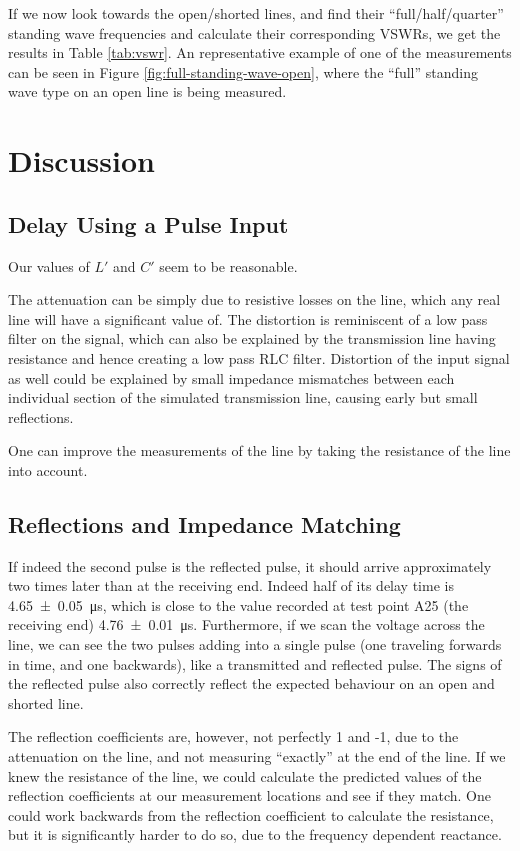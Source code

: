 \documentclass[a4paper]{scrartcl}
\begin{document}
If we now look towards the open/shorted lines, and find their ``full/half/quarter'' standing wave frequencies and calculate their corresponding VSWRs, we get the results in Table \ref{tab:vswr}. An representative example of one of the measurements can be seen in Figure \ref{fig:full-standing-wave-open}, where the ``full'' standing wave type on an open line is being measured.

\section{Discussion}
\subsection{Delay Using a Pulse Input}
Our values of \(L'\) and \(C'\) seem to be reasonable.

The attenuation can be simply due to resistive losses on the line, which any real line will have a significant value of. The distortion is reminiscent of a low pass filter on the signal, which can also be explained by the transmission line having resistance and hence creating a low pass RLC filter. Distortion of the input signal as well could be explained by small impedance mismatches between each individual section of the simulated transmission line, causing early but small reflections.

One can improve the measurements of the line by taking the resistance of the line into account.

\subsection{Reflections and Impedance Matching}
If indeed the second pulse is the reflected pulse, it should arrive approximately two times later than at the receiving end. Indeed half of its delay time is \SI{4.65 \pm 0.05}{\micro\second}, which is close to the value recorded at test point A25 (the receiving end) \SI{4.76 \pm 0.01}{\micro\second}. Furthermore, if we scan the voltage across the line, we can see the two pulses adding into a single pulse (one traveling forwards in time, and one backwards), like a transmitted and reflected pulse. The signs of the reflected pulse also correctly reflect the expected behaviour on an open and shorted line.

The reflection coefficients are, however, not perfectly 1 and -1, due to the attenuation on the line, and not measuring ``exactly'' at the end of the line. If we knew the resistance of the line, we could calculate the predicted values of the reflection coefficients at our measurement locations and see if they match. One could work backwards from the reflection coefficient to calculate the resistance, but it is significantly harder to do so, due to the frequency dependent reactance.
\end{document}
